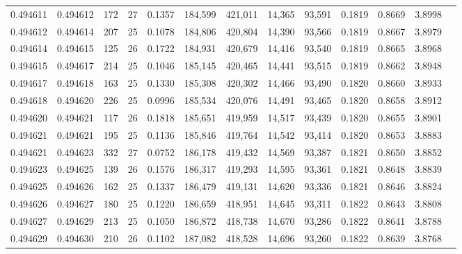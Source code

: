 \begin{tabular}{rrrrrrrrrrrrr}
0.494611 & 0.494612 & 172 &  27 &                                     0.1357 & 184,599 & 421,011 &  14,365 &  93,591 & 0.1819 & 0.8669 & 3.8998 \\
0.494612 & 0.494614 & 207 &  25 &                                     0.1078 & 184,806 & 420,804 &  14,390 &  93,566 & 0.1819 & 0.8667 & 3.8979 \\
0.494614 & 0.494615 & 125 &  26 &                                     0.1722 & 184,931 & 420,679 &  14,416 &  93,540 & 0.1819 & 0.8665 & 3.8968 \\
0.494615 & 0.494617 & 214 &  25 &                                     0.1046 & 185,145 & 420,465 &  14,441 &  93,515 & 0.1819 & 0.8662 & 3.8948 \\
0.494617 & 0.494618 & 163 &  25 &                                     0.1330 & 185,308 & 420,302 &  14,466 &  93,490 & 0.1820 & 0.8660 & 3.8933 \\
0.494618 & 0.494620 & 226 &  25 &                                     0.0996 & 185,534 & 420,076 &  14,491 &  93,465 & 0.1820 & 0.8658 & 3.8912 \\
0.494620 & 0.494621 & 117 &  26 &                                     0.1818 & 185,651 & 419,959 &  14,517 &  93,439 & 0.1820 & 0.8655 & 3.8901 \\
0.494621 & 0.494621 & 195 &  25 &                                     0.1136 & 185,846 & 419,764 &  14,542 &  93,414 & 0.1820 & 0.8653 & 3.8883 \\
0.494621 & 0.494623 & 332 &  27 &                                     0.0752 & 186,178 & 419,432 &  14,569 &  93,387 & 0.1821 & 0.8650 & 3.8852 \\
0.494623 & 0.494625 & 139 &  26 &                                     0.1576 & 186,317 & 419,293 &  14,595 &  93,361 & 0.1821 & 0.8648 & 3.8839 \\
0.494625 & 0.494626 & 162 &  25 &                                     0.1337 & 186,479 & 419,131 &  14,620 &  93,336 & 0.1821 & 0.8646 & 3.8824 \\
0.494626 & 0.494627 & 180 &  25 &                                     0.1220 & 186,659 & 418,951 &  14,645 &  93,311 & 0.1822 & 0.8643 & 3.8808 \\
0.494627 & 0.494629 & 213 &  25 &                                     0.1050 & 186,872 & 418,738 &  14,670 &  93,286 & 0.1822 & 0.8641 & 3.8788 \\
0.494629 & 0.494630 & 210 &  26 &                                     0.1102 & 187,082 & 418,528 &  14,696 &  93,260 & 0.1822 & 0.8639 & 3.8768 \\

\end{tabular}
